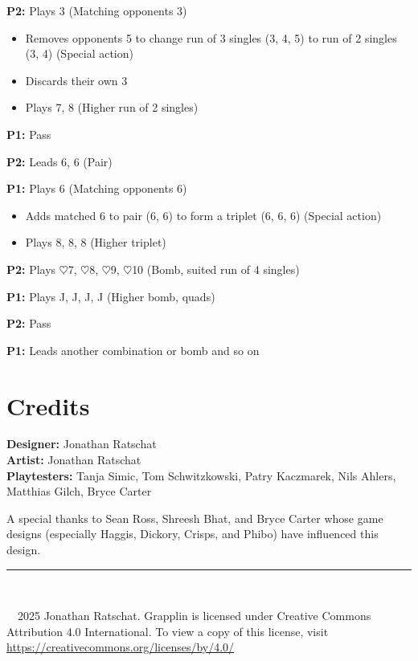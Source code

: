 \documentclass[11pt,a4paper]{article}
\begin{document}
\medskip
\noindent\textbf{P2:} Plays 3 (Matching opponents 3)
\begin{itemize}[nosep]
    \item Removes opponents 5 to change run of 3 singles (3, 4, 5) to run of 2 singles (3, 4) (Special action)
    \item Discards their own 3
    \item Plays 7, 8 (Higher run of 2 singles)
\end{itemize}

\medskip
\noindent\textbf{P1:} Pass

\medskip
\noindent\textbf{P2:} Leads 6, 6 (Pair)

\medskip
\noindent\textbf{P1:} Plays 6 (Matching opponents 6)
\begin{itemize}[nosep]
    \item Adds matched 6 to pair (6, 6) to form a triplet (6, 6, 6) (Special action)
    \item Plays 8, 8, 8 (Higher triplet)
\end{itemize}

\medskip
\noindent\textbf{P2:} Plays $\heartsuit$7, $\heartsuit$8, $\heartsuit$9, $\heartsuit$10 (Bomb, suited run of 4 singles)

\medskip
\noindent\textbf{P1:} Plays J, J, J, J (Higher bomb, quads)

\medskip
\noindent\textbf{P2:} Pass

\medskip
\noindent\textbf{P1:} Leads another combination or bomb and so on

\section{Credits}

\noindent\textbf{Designer:} Jonathan Ratschat\\
\textbf{Artist:} Jonathan Ratschat\\
\textbf{Playtesters:} Tanja Simic, Tom Schwitzkowski, Patry Kaczmarek, Nils Ahlers, Matthias Gilch, Bryce Carter

\bigskip
\noindent A special thanks to Sean Ross, Shreesh Bhat, and Bryce Carter whose game designs (especially Haggis, Dickory, Crisps, and Phibo) have influenced this design.

\vfill
\noindent\rule{\columnwidth}{0.4pt}\\[0.5em]
\noindent\begin{minipage}{\columnwidth}
\ccby\ \small \textcopyright\ 2025 Jonathan Ratschat. Grapplin is licensed under Creative Commons Attribution 4.0 International. To view a copy of this license, visit \url{https://creativecommons.org/licenses/by/4.0/}
\end{minipage}
\end{document}
